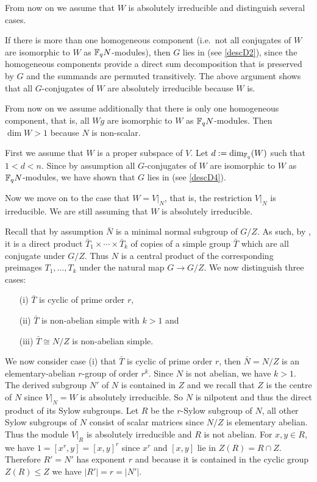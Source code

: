 From now on we assume that $W$ is absolutely irreducible and
distinguish several cases.

If there is more than one homogeneous component (i.e.~not all conjugates of
$W$ are isomorphic to $W$ as $\mathbb{F}_q N$-modules), then $G$ lies in 
(see \ref{descD2}),
since the homogeneous components provide a direct sum decomposition that is
preserved by $G$ and the summands are permuted transitively. The above
argument shows that all $G$-conjugates of $W$ are absolutely
irreducible because $W$ is.

From now on we assume additionally that there is only one homogeneous
component, that is, all $Wg$ are isomorphic to $W$ as $\mathbb{F}_q N$-modules.
Then $\dim W > 1$ because $N$ is non-scalar.

First we assume that $W$ is a proper subspace of $V$. Let $d :=
\dim_{\mathbb{F}_q}(W)$ such that $1 < d < n$. Since by assumption 
all $G$-conjugates of $W$ are isomorphic to $W$ as $\mathbb{F}_q N$-modules,
we have shown that $G$ lies in  (see \ref{descD4}).

Now we move on to the case that $W = V|_N$, that is, the restriction
$V|_N$ is irreducible. We are still assuming that $W$ is
absolutely irreducible.

Recall that by assumption $\bar N$ is a minimal normal subgroup of $G/Z$.
As such, by \cite[Theorem 4.3A.(iii)]{DixonMort}, it is
a direct product $\bar T_1 \times \cdots \times \bar T_k$ of copies of a 
simple group $\bar T$ which are all conjugate under $G/Z$. Thus $N$ is
a central product of the corresponding preimages $T_1, \ldots, T_k$
under the natural map $G \to G/Z$. We now distinguish three cases:
\begin{itemize}\setlength{\itemsep}{0pt}\setlength{\parskip}{0pt}
\item[(i)] $\bar T$ is cyclic of prime order $r$, 
\item[(ii)] $\bar T$ is non-abelian simple with $k > 1$ and
\item[(iii)] $\bar T \cong N/Z$ is non-abelian simple.
\end{itemize}
We now consider case (i) that $\bar T$ is cyclic of prime order $r$, then
$\bar N = N/Z$ is an elementary-abelian $r$-group of order $r^k$.
Since $N$ is not abelian, we have $k > 1$.
The derived subgroup $N'$ of $N$ is contained in $Z$ and
we recall that $Z$ is the centre of $N$ since $V|_N = W$ is absolutely
irreducible. So $N$ is nilpotent and thus the direct product of its
Sylow subgroups. Let $R$ be the $r$-Sylow subgroup of $N$, all other
Sylow subgroups of $N$ consist of scalar matrices since $N/Z$ is
elementary abelian. Thus the module $V|_R$ is absolutely irreducible
and $R$ is not abelian.
For $x,y \in R$, we have $1 = [x^r,y] = [x,y]^r$ since $x^r$ and 
$[x,y]$ lie in $Z(R) = R \cap Z$. Therefore $R'=N'$ has exponent $r$ and
because it is contained in the cyclic group $Z(R) \le Z$ we have $|R'| =
r = |N'|$.

